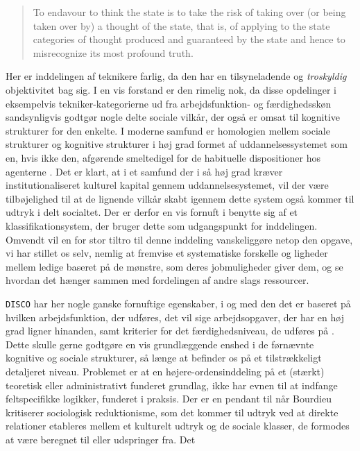 %
 \begin{quote} \small %
	To endavour to think the state is to take the risk of taking over (or being taken over by) a thought of the state, that is, of applying to the state categories of thought produced and 	guaranteed by the state and hence to misrecognize its most profound truth. 
 \end{quote}
Her er inddelingen af teknikere farlig, da den har en tilsyneladende og \emph{troskyldig} objektivitet bag sig. I en vis forstand er den rimelig nok, da disse opdelinger i eksempelvis tekniker-kategorierne ud fra arbejdsfunktion- og færdighedsskøn sandsynligvis godtgør nogle delte sociale vilkår, der også er omsat til kognitive strukturer for den enkelte. I moderne samfund er homologien mellem sociale strukturer og kognitive strukturer i høj grad formet af uddannelsessystemet som en, hvis ikke den, afgørende smeltedigel for de habituelle dispositioner hos agenterne \parencite[12]{Bourdieu1992}. Det er klart, at i et samfund der i så høj grad kræver institutionaliseret kulturel kapital gennem uddannelsesystemet, vil der være tilbøjelighed til at de lignende vilkår skabt igennem dette system også kommer til udtryk i delt socialtet. Der er derfor en vis fornuft i benytte sig af et klassifikationsystem, der bruger dette som udgangspunkt for inddelingen. Omvendt vil en for stor tiltro til denne inddeling vanskeliggøre netop den opgave, vi har stillet os selv, nemlig at fremvise et systematiske forskelle og ligheder mellem ledige baseret på de mønstre, som deres jobmuligheder giver dem, og se hvordan det hænger sammen med fordelingen af andre slags ressourcer. 

\texttt{DISCO} har her nogle ganske fornuftige egenskaber, i og med den det er baseret på hvilken arbejdsfunktion, der udføres, det vil sige arbejdsopgaver, der har en høj grad ligner hinanden, samt kriterier for det færdighedsniveau, de udføres på \textcite{DST2014b}. Dette skulle gerne godtgøre en vis grundlæggende enshed i de førnævnte kognitive og sociale strukturer, så længe at befinder os på et tilstrækkeligt detaljeret niveau. Problemet er at en højere-ordensinddeling på et (stærkt) teoretisk eller administrativt funderet grundlag, ikke har evnen til at indfange feltspecifikke logikker, funderet i praksis. Der er en pendant til når Bourdieu kritiserer  sociologisk reduktionisme, som det kommer til udtryk ved at direkte relationer etableres mellem et kulturelt udtryk og de sociale klasser, de formodes at være beregnet til eller udspringer fra. Det 



